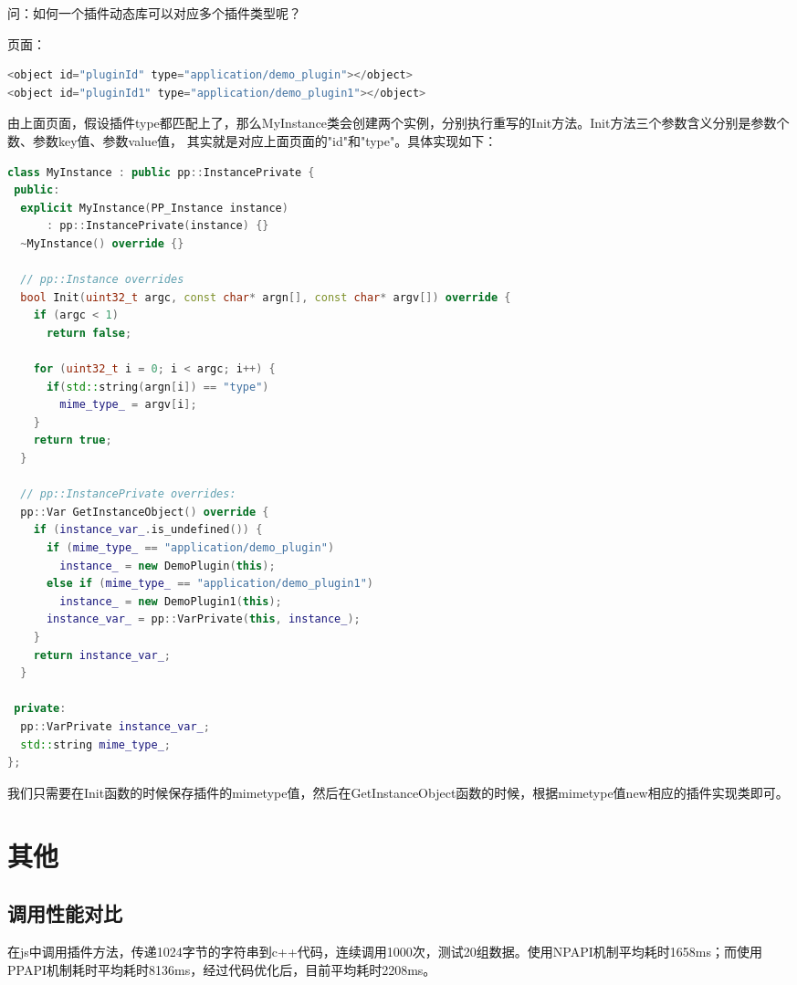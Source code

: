 \vspace{10ex}
问：如何一个插件动态库可以对应多个插件类型呢？\par
页面：
\begin{spacing}{1.0}
\begin{lstlisting}[language={C++}]
<object id="pluginId" type="application/demo_plugin"></object>
<object id="pluginId1" type="application/demo_plugin1"></object>
\end{lstlisting}
\end{spacing}

由上面页面，假设插件type都匹配上了，那么MyInstance类会创建两个实例，分别执行重写的Init方法。Init方法三个参数含义分别是参数个数、参数key值、参数value值，
其实就是对应上面页面的"id"和"type"。具体实现如下：
\begin{spacing}{1.0}
\begin{lstlisting}[language={C++}]
class MyInstance : public pp::InstancePrivate {
 public:
  explicit MyInstance(PP_Instance instance)
      : pp::InstancePrivate(instance) {}
  ~MyInstance() override {}

  // pp::Instance overrides
  bool Init(uint32_t argc, const char* argn[], const char* argv[]) override {
    if (argc < 1)
      return false;
      
    for (uint32_t i = 0; i < argc; i++) {
      if(std::string(argn[i]) == "type")
        mime_type_ = argv[i];
    }
    return true;
  }

  // pp::InstancePrivate overrides:
  pp::Var GetInstanceObject() override {
    if (instance_var_.is_undefined()) {
      if (mime_type_ == "application/demo_plugin")
        instance_ = new DemoPlugin(this);
      else if (mime_type_ == "application/demo_plugin1")
        instance_ = new DemoPlugin1(this);
      instance_var_ = pp::VarPrivate(this, instance_);
    }
    return instance_var_;
  }

 private:
  pp::VarPrivate instance_var_;
  std::string mime_type_;
};
\end{lstlisting}
\end{spacing}

我们只需要在Init函数的时候保存插件的mimetype值，然后在GetInstanceObject函数的时候，根据mimetype值new相应的插件实现类即可。

\section{其他}
\subsection{调用性能对比}
在js中调用插件方法，传递1024字节的字符串到c++代码，连续调用1000次，测试20组数据。使用NPAPI机制平均耗时1658ms；而使用PPAPI机制耗时平均耗时8136ms，经过代码优化后，目前平均耗时2208ms。

